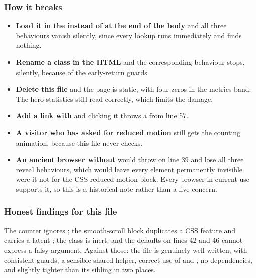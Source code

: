 \subsubsection*{How it breaks}

\begin{itemize}
\item \textbf{Load it in the  instead of at the end of the body} and
  all three behaviours vanish silently, since every lookup runs immediately and
  finds nothing.
\item \textbf{Rename a class in the HTML} and the corresponding behaviour stops,
  silently, because of the early-return guards.
\item \textbf{Delete this file} and the page is static, with four zeros in the
  metrics band. The hero statistics still read correctly, which limits the damage.
\item \textbf{Add a link with } and clicking it throws a
   from line 57.
\item \textbf{A visitor who has asked for reduced motion} still gets the counting
  animation, because this file never checks.
\item \textbf{An ancient browser without } would throw on
  line 39 and lose all three reveal behaviours, which would leave every
   element permanently invisible were it not for the CSS
  reduced-motion block. Every browser in current use supports it, so this is a
  historical note rather than a live concern.
\end{itemize}

\subsubsection*{Honest findings for this file}

The counter ignores ; the smooth-scroll block
duplicates a CSS feature and carries a latent ; the
 class is inert; and the \code{||} defaults on lines 42 and 46 cannot
express a falsy argument. Against those: the file is genuinely well written, with
consistent guards, a sensible shared helper, correct use of  and
, no dependencies, and slightly tighter than its sibling in two
places.
